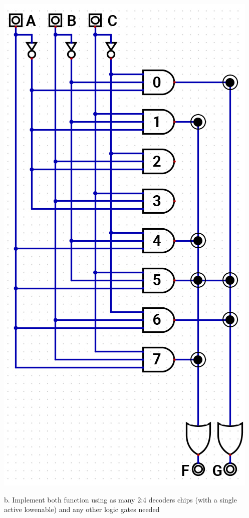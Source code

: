 \documentclass{article}
\begin{document}
    \begin{center}
        \includegraphics[scale=0.3]{HW4_q3.png}
    \end{center}

    b. Implement both function using as many 2:4 decoders chips (with a single active 
    lowenable) and any other logic gates needed
\end{document}
